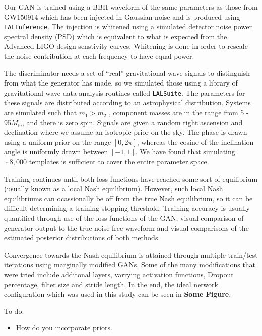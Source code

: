 \documentclass[%
showpacs,
 amsmath,amssymb,
 aps,
 twocolumn,
 prl,
 reprint,
floatfix,
]{revtex4-1}
\begin{document}
Our GAN is trained using a BBH waveform of the same parameters as those from GW150914 which has been injected in Gaussian noise and is produced using \texttt{LALInference}. The injection is whitened using a simulated detector noise power spectral density (PSD) which is equivalent to what is expected from the Advanced LIGO design senstivity curves. Whitening is done in order to rescale the noise contribution at each frequency to have equal power.


The discriminator needs a set of ``real'' gravitational wave signals to distinguish from what the generator has made, so we simulated those using a library of gravitational wave data analysis routines called \texttt{LALSuite}. The parameters for these signals are distributed according to an astrophysical distribution. Systems are simulated such that $m_{1} > m_{2}$ , component masses are in the range from 5 - 95\(M_\odot\), and there is zero spin. Signals are given a random right ascension and declination where we assume an isotropic prior on the sky. The phase is drawn using a uniform prior on the range $[0,2\pi]$, whereas the cosine of the inclination angle is uniformly drawn between $[-1,1]$. We have found that simulating $\sim8,000$ templates is sufficient to cover the entire parameter space. 

Training continues until both loss functions have reached some sort of equilibrium (usually known as a local Nash equilibrium). However, such local Nash equilibriums can ocassionally be off from the true Nash equilibrium, so it can be difficult determining a training stopping threshold. Training accuracy is usually quantified through use of the loss functions of the GAN, visual comparison of generator output to the true noise-free waveform and visual comparisons of the estimated posterior distributions of both methods.

Convergence towards the Nash equilibrium is attained through multiple train/test iterations using marginally modified GANs. Some of the many modifications that were tried include additonal layers, varrying activation functions, Dropout percentage, filter size and stride length. In the end, the ideal network configuration which was used in this study can be seen in \textbf{Some Figure}. 

To-do:

\begin{itemize}
\item How do you incorporate priors.
\end{itemize}
\end{document}
